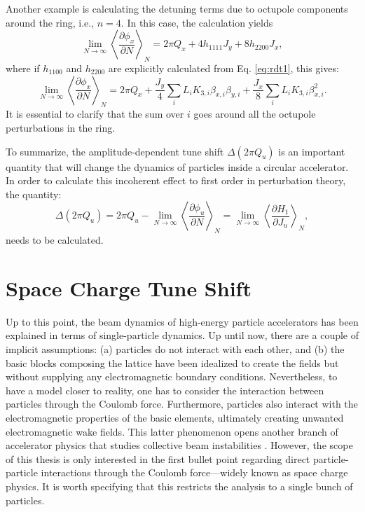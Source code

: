 Another example is calculating the detuning terms due to octupole components around the ring, i.e., $n=4$. In this case, the calculation yields
\begin{equation}
    \label{eq:octu}
    \lim_{N\to\infty} \left\langle \frac{\partial \phi_x}{\partial N}\right\rangle _N = 2\pi Q_x + 4h_{1111}J_y + 8 h_{2200} J_x,
\end{equation}
where if $h_{1100}$ and $h_{2200}$ are explicitly calculated from Eq. \ref{eq:rdt1}, this gives:
\begin{equation}
    \label{eq:octu2}
    \lim_{N\to\infty} \left\langle \frac{\partial \phi_x}{\partial N}\right\rangle _N = 2\pi Q_x + \frac{J_y}{4}\sum_i L_i K_{3,i} \beta_{x,i} \beta_{y,i} + \frac{J_x}{8}\sum_i L_i K_{3,i} \beta_{x,i}^2.
\end{equation}
It is essential to clarify that the sum over $i$ goes around all the octupole perturbations in the ring.

To summarize, the amplitude-dependent tune shift $\Delta\left( 2 \pi Q_u \right)$ is an important quantity that will change the dynamics of particles inside a circular accelerator. In order to calculate this incoherent effect to first order in perturbation theory, the quantity:
\begin{equation}
    \label{eq:adtsfinal}
    \Delta\left( 2 \pi Q_u \right) = 2\pi Q_u - \lim_{N\to\infty} \left\langle \frac{\partial \phi_u}{\partial N}\right\rangle _N = \lim_{N\to\infty} \left\langle \frac{\partial H_1}{\partial J_u} \right\rangle _N, 
\end{equation}
needs to be calculated. 

\section{\label{sec:sc1}Space Charge Tune Shift}

Up to this point, the beam dynamics of high-energy particle accelerators has been explained in terms of single-particle dynamics. Up until now, there are a couple of implicit assumptions: (a) particles do not interact with each other, and (b) the basic blocks composing the lattice have been idealized to create the fields but without supplying any electromagnetic boundary conditions. Nevertheless, to have a model closer to reality, one has to consider the interaction between particles through the Coulomb force. Furthermore, particles also interact with the electromagnetic properties of the basic elements, ultimately creating unwanted electromagnetic wake fields. This latter phenomenon opens another branch of accelerator physics that studies collective beam instabilities \cite{chao}. However, the scope of this thesis is only interested in the first bullet point regarding direct particle-particle interactions through the Coulomb force---widely known as space charge physics. It is worth specifying that this restricts the analysis to a single bunch of particles. 

